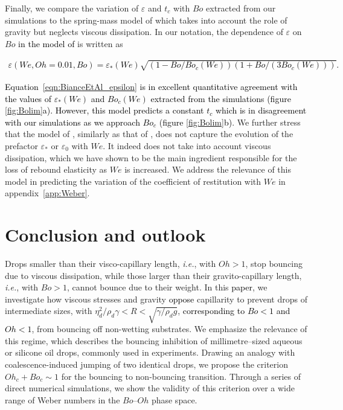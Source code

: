 \documentclass{jfm}
\newcommand{\Ohn}{\mathit{Oh}}
\newcommand{\Ohc}{\mathit{Oh}_\mathit{c}}
\newcommand{\Wen}{\mathit{We}}
\newcommand{\Bon}{\mathit{Bo}}
\newcommand{\Boc}{\mathit{Bo}_\mathit{c}}
\newcommand{\revRev}[1]{\textcolor{black}{#1}}
\begin{document}
Finally, we compare the variation of $\varepsilon$ and $t_c$ with $\Bon$ extracted from our simulations to the spring-mass model of \citet{biance2006} which takes into account the role of gravity but neglects viscous dissipation.
In our notation, the dependence of $\varepsilon$ on $\Bon$ \revRev{in the model of \citet{biance2006}} is written as

\revRev{\begin{align}
	\label{eqn:BianceEtAl_epsilon} 
	\varepsilon\left(\Wen, \Ohn = 0.01, \Bon\right) = \varepsilon_*\left(\Wen\right)\sqrt{\left(1-\Bon/\Boc\left(\Wen\right)\right)\left(1 + \Bon/\left(3\Boc\left(\Wen\right)\right)\right)}.
\end{align}}

\noindent \revRev{Equation~\eqref{eqn:BianceEtAl_epsilon} is in excellent quantitative agreement with the values of \revRev{$\varepsilon_*(\Wen)$} and \revRev{$\Boc(\Wen)$} extracted from the simulations (figure \ref{fig:Bolim}a). However, this model predicts a constant $t_c$ which is in disagreement with our simulations as we approach $Bo_c$ (figure \ref{fig:Bolim}b)}. We further stress that the model of \citet{biance2006}, similarly as that of \citet{jha2020viscous}, does not capture the evolution of the prefactor $\varepsilon_*$ or $\varepsilon_0$ with $\Wen$. It indeed does not take into account viscous dissipation, which we have shown to be the main ingredient responsible for the loss of rebound elasticity as $\Wen$ is increased. We address the relevance of this model in predicting the variation of the coefficient of restitution with $\Wen$ in appendix~\ref{app:Weber}.

\section{Conclusion and outlook}\label{sec:Conclusion}

Drops smaller than their visco-capillary length, {\it i.e.}, with $\Ohn > 1$, stop bouncing due to viscous dissipation, while those larger than their gravito-capillary length, {\it i.e.}, with $\Bon > 1$, cannot bounce due to their weight. 
In this \revRev{paper}, we investigate how viscous stresses and gravity %
\revRev{oppose} capillarity to prevent drops of intermediate sizes, with $\eta_d^2/\rho_d\gamma < R < \sqrt{\gamma/\rho_d g}$, \revRev{corresponding to $\Bon < 1$ and $\Ohn < 1$}, from bouncing off non-wetting substrates.
We emphasize the relevance of this regime, which describes the bouncing inhibition of millimetre--sized aqueous or silicone oil drops, commonly used in experiments. Drawing an analogy with coalescence-induced jumping of two identical drops, we propose the criterion $\Ohc + \Boc \sim 1$ for the bouncing to non-bouncing transition. Through a series of direct numerical simulations, we show the validity of this criterion over a wide range of Weber numbers in the $\Bon$--$\Ohn$ phase space.
\end{document}
